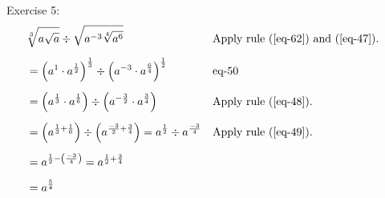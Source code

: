 Exercise 5:
\begin{align*}
    &\sqrt[3]{a\sqrt{a}} \div \sqrt{a^{-3}\sqrt[4]{a^6}} &&\text{Apply rule \bref{eq-62} and \bref{eq-47}.}&\\[1.25ex]
    &= \left(a^1 \cdot a^{\frac{1}{2}}\right)^{\frac{1}{3}} \div \left(a^{-3} \cdot a^{\frac{6}{4}}\right)^{\frac{1}{2}}&&\text{eq-50}&\\[1.25ex]
    &= \left(a^{\frac{1}{3}} \cdot a^{\frac{1}{6}}\right) \div \left(a^{-\frac{3}{2}} \cdot a^{\frac{3}{4}}\right)&&\text{Apply rule \bref{eq-48}.}&\\[1.25ex]
    &= \left(a^{\frac{1}{3}+\frac{1}{6}}\right) \div \left(a^{\frac{-3}{2}+\frac{3}{4}}\right) = a^{\frac{1}{2}} \div a^{\frac{-3}{4}}&&\text{Apply rule \bref{eq-49}.}&\\[1.25ex]
    &= a^{\frac{1}{2}-\left(\frac{-3}{4}\right)} = a^{\frac{1}{2} + \frac{3}{4}}&\\[1.25ex]
    &= a^{\frac{5}{4}}
\end{align*}